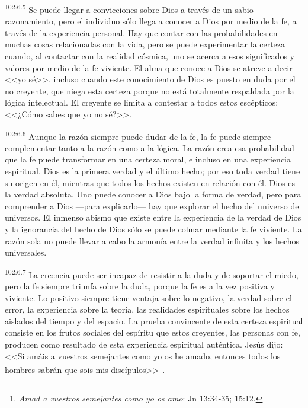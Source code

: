 \par
\textsuperscript{102:6.5} Se puede llegar a convicciones sobre Dios a través de un sabio razonamiento, pero el individuo sólo llega a conocer a Dios por medio de la fe, a través de la experiencia personal. Hay que contar con las probabilidades en muchas cosas relacionadas con la vida, pero se puede experimentar la certeza cuando, al contactar con la realidad cósmica, uno se acerca a esos significados y valores por medio de la fe viviente. El alma que conoce a Dios se atreve a decir <<yo sé>>, incluso cuando este conocimiento de Dios es puesto en duda por el no creyente, que niega esta certeza porque no está totalmente respaldada por la lógica intelectual. El creyente se limita a contestar a todos estos escépticos: <<¿Cómo sabes que yo no sé?>>.

\par
\textsuperscript{102:6.6} Aunque la razón siempre puede dudar de la fe, la fe puede siempre complementar tanto a la razón como a la lógica. La razón crea esa probabilidad que la fe puede transformar en una certeza moral, e incluso en una experiencia espiritual. Dios es la primera verdad y el último hecho; por eso toda verdad tiene su origen en él, mientras que todos los hechos existen en relación con él. Dios es la verdad absoluta. Uno puede conocer a Dios bajo la forma de verdad, pero para comprender a Dios ---para explicarlo--- hay que explorar el hecho del universo de universos. El inmenso abismo que existe entre la experiencia de la verdad de Dios y la ignorancia del hecho de Dios sólo se puede colmar mediante la fe viviente. La razón sola no puede llevar a cabo la armonía entre la verdad infinita y los hechos universales.

\par
\textsuperscript{102:6.7} La creencia puede ser incapaz de resistir a la duda y de soportar el miedo, pero la fe siempre triunfa sobre la duda, porque la fe es a la vez positiva y viviente. Lo positivo siempre tiene ventaja sobre lo negativo, la verdad sobre el error, la experiencia sobre la teoría, las realidades espirituales sobre los hechos aislados del tiempo y del espacio. La prueba convincente de esta certeza espiritual consiste en los frutos sociales del espíritu que estos creyentes, las personas con fe, producen como resultado de esta experiencia espiritual auténtica. Jesús dijo: <<Si amáis a vuestros semejantes como yo os he amado, entonces todos los hombres sabrán que sois mis discípulos>>\footnote{\textit{Amad a vuestros semejantes como yo os amo}: Jn 13:34-35; 15:12.}.

